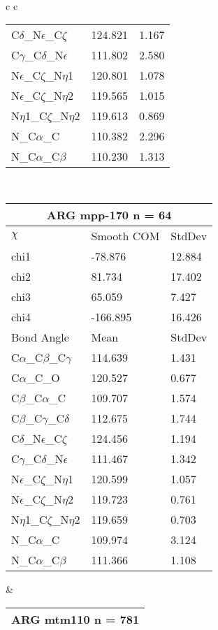 \begin{longtable}{ c c }
\begin{tabular}{ l l l }
  C$\delta$\_N$\epsilon$\_C$\zeta$ & 124.821 & 1.167\\
  C$\gamma$\_C$\delta$\_N$\epsilon$ & 111.802 & 2.580\\
  N$\epsilon$\_C$\zeta$\_N$\eta$1 & 120.801 & 1.078\\
  N$\epsilon$\_C$\zeta$\_N$\eta$2 & 119.565 & 1.015\\
  N$\eta$1\_C$\zeta$\_N$\eta$2 & 119.613 & 0.869\\
  N\_C$\alpha$\_C & 110.382 & 2.296\\
  N\_C$\alpha$\_C$\beta$ & 110.230 & 1.313\\
  \bottomrule
  \end{tabular}
  \\
  \begin{tabular}{ l l l }
  \toprule
  \multicolumn{3}{c}{ARG \textbf{mpp-170} n = 64} \\ \toprule
  $\chi$       & Smooth COM & StdDev \\ \midrule
  chi1 & -78.876 & 12.884 \\ 
  chi2 & 81.734 & 17.402 \\ 
  chi3 & 65.059 & 7.427 \\ 
  chi4 & -166.895 & 16.426 \\ \midrule
  Bond Angle   & Mean     & StdDev \\ \midrule
  C$\alpha$\_C$\beta$\_C$\gamma$ & 114.639 & 1.431\\
  C$\alpha$\_C\_O & 120.527 & 0.677\\
  C$\beta$\_C$\alpha$\_C & 109.707 & 1.574\\
  C$\beta$\_C$\gamma$\_C$\delta$ & 112.675 & 1.744\\
  C$\delta$\_N$\epsilon$\_C$\zeta$ & 124.456 & 1.194\\
  C$\gamma$\_C$\delta$\_N$\epsilon$ & 111.467 & 1.342\\
  N$\epsilon$\_C$\zeta$\_N$\eta$1 & 120.599 & 1.057\\
  N$\epsilon$\_C$\zeta$\_N$\eta$2 & 119.723 & 0.761\\
  N$\eta$1\_C$\zeta$\_N$\eta$2 & 119.659 & 0.703\\
  N\_C$\alpha$\_C & 109.974 & 3.124\\
  N\_C$\alpha$\_C$\beta$ & 111.366 & 1.108\\
  \bottomrule
  \end{tabular}
  &
  \begin{tabular}{ l l l }
  \toprule
  \multicolumn{3}{c}{ARG \textbf{mtm110} n = 781} \\ \toprule

\end{tabular}
\end{longtable}
